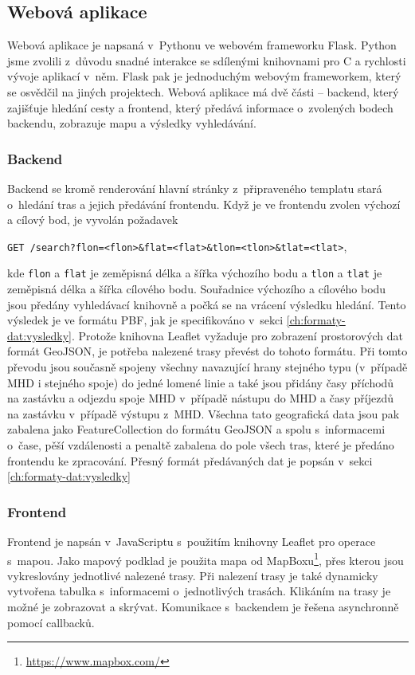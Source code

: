 \subsection{Webová aplikace}
\label{ch:implementace:webapp}
Webová aplikace je napsaná v~Pythonu ve webovém frameworku Flask\cite{Flask}.
Python jsme zvolili z~důvodu snadné interakce se sdílenými knihovnami pro C a
rychlosti vývoje aplikací v~něm. Flask pak je jednoduchým webovým frameworkem,
který se osvědčil na jiných projektech. Webová aplikace má dvě části -- backend,
který zajišťuje hledání cesty a frontend, který předává informace o~zvolených
bodech backendu, zobrazuje mapu a výsledky vyhledávání. 

\subsubsection{Backend}
Backend se kromě renderování hlavní stránky z~připraveného templatu stará
o~hledání tras a jejich předávání frontendu. Když je ve frontendu zvolen výchozí a
cílový bod, je vyvolán požadavek\\[0mm]
\begin{center}
\vspace*{-0.5cm}
 {\tt GET /search?flon=<flon>\&flat=<flat>\&tlon=<tlon>\&tlat=<tlat>},\\[0mm]
\end{center}
kde {\tt flon} a
{\tt flat} je zeměpisná délka a šířka výchozího bodu a {\tt tlon} a {\tt tlat}
je zeměpisná délka a šířka cílového bodu. Souřadnice výchozího a cílového bodu
jsou předány vyhledávací knihovně a počká se na vrácení výsledku hledání. Tento
výsledek je ve formátu PBF, jak je specifikováno v~sekci \ref{ch:formaty-dat:vysledky}.
Protože knihovna Leaflet vyžaduje pro zobrazení prostorových dat formát
GeoJSON\cite{GeoJSON}, je potřeba nalezené trasy převést do tohoto formátu. Při
tomto převodu jsou současně spojeny všechny navazující hrany stejného typu
(v~případě MHD i stejného spoje) do jedné lomené linie a také jsou přidány časy
příchodů na zastávku a odjezdu spoje MHD v~případě nástupu do MHD a časy
příjezdů na zastávku v~případě výstupu z~MHD. Všechna tato geografická data jsou
pak zabalena jako FeatureCollection do formátu GeoJSON a spolu s~informacemi
o~čase, pěší vzdálenosti a penaltě zabalena do pole všech tras, které je předáno
frontendu ke zpracování. Přesný formát předávaných dat je popsán v~sekci \ref{ch:formaty-dat:vysledky}
\subsubsection{Frontend}
Frontend je napsán v~JavaScriptu s~použitím knihovny Leaflet pro operace
s~mapou. Jako mapový podklad je použita mapa od
MapBoxu\footnote{\url{https://www.mapbox.com/}}, přes kterou
jsou vykreslovány jednotlivé nalezené trasy. Při nalezení trasy je také
dynamicky vytvořena tabulka s~informacemi o~jednotlivých trasách. Klikáním na
trasy je možné je zobrazovat a skrývat. Komunikace s~backendem je řešena
asynchronně pomocí callbacků.
